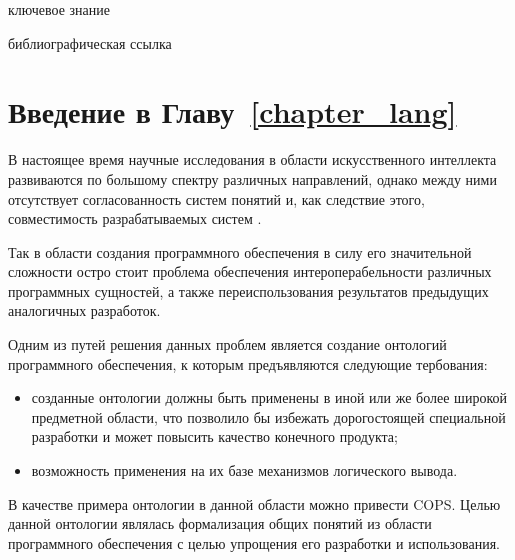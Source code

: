 \begin{SCn}
    \begin{scnrelfromlist}{ключевое знание}
    \end{scnrelfromlist}

    \bigskip

    \begin{scnrelfromlist}{библиографическая ссылка}
    \end{scnrelfromlist}

\end{SCn}

\section*{Введение в Главу~\ref{chapter_lang}}

В настоящее время научные исследования в области искусственного интеллекта развиваются по большому спектру различных направлений, однако между ними отсутствует согласованность систем понятий и, как следствие этого, совместимость разрабатываемых систем \cite{GolenkovProblems2021}.

Так в области создания программного обеспечения в силу его значительной сложности остро стоит проблема обеспечения интероперабельности различных программных сущностей, а также переиспользования результатов предыдущих аналогичных разработок.

Одним из путей решения данных проблем является создание онтологий программного обеспечения, к которым предъявляются следующие тербования\cite{ontologiiess_in_software_engineering}:
\begin{itemize}
     спецификация формальной семантики для избежания двусмысленных определений, а также нежелательных интерпретаций с целью обеспечения интероперабельности;
    \item созданные онтологии должны быть применены в иной или же более широкой предметной области, что позволило бы избежать дорогостоящей специальной разработки и может повысить качество конечного продукта;
    \item возможность применения на их базе механизмов логического вывода.
\end{itemize}

В качестве примера онтологии в данной области можно привести COPS\cite{cops_ontology}. Целью данной онтологии являлась формализация общих понятий из области программного обеспечения с целью упрощения его разработки и использования.

